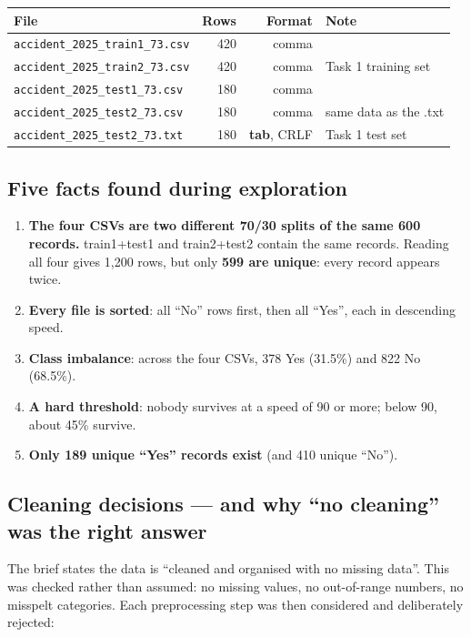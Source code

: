 \documentclass[11pt,a4paper]{article}
\newcommand{\cd}[1]{\texttt{#1}}                     %
\begin{document}
\begin{tabularx}{\linewidth}{@{}lrrL@{}}
\toprule
File & Rows & Format & Note \\ \midrule
\cd{accident\_2025\_train1\_73.csv} & 420 & comma & \\
\cd{accident\_2025\_train2\_73.csv} & 420 & comma & Task 1 training set \\
\cd{accident\_2025\_test1\_73.csv}  & 180 & comma & \\
\cd{accident\_2025\_test2\_73.csv}  & 180 & comma & same data as the .txt \\
\cd{accident\_2025\_test2\_73.txt}  & 180 & \textbf{tab}, CRLF & Task 1 test set \\ \bottomrule
\end{tabularx}

\subsection{Five facts found during exploration}
\begin{enumerate}
  \item \textbf{The four CSVs are two different 70/30 splits of the same 600 records.} train1+test1 and
        train2+test2 contain the same records. Reading all four gives 1,200 rows, but only \textbf{599 are unique}:
        every record appears twice.
  \item \textbf{Every file is sorted}: all ``No'' rows first, then all ``Yes'', each in descending speed.
  \item \textbf{Class imbalance}: across the four CSVs, 378 Yes (31.5\%) and 822 No (68.5\%).
  \item \textbf{A hard threshold}: nobody survives at a speed of 90 or more; below 90, about 45\% survive.
  \item \textbf{Only 189 unique ``Yes'' records exist} (and 410 unique ``No'').
\end{enumerate}

\subsection{Cleaning decisions --- and why ``no cleaning'' was the right answer}
The brief states the data is ``cleaned and organised with no missing data''. This was checked rather than
assumed: no missing values, no out-of-range numbers, no misspelt categories. Each preprocessing step was then
considered and deliberately rejected:
\end{document}
